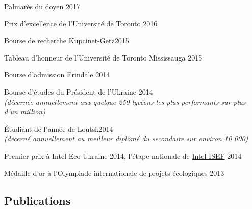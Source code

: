 \documentclass[margin,line]{res}
\begin{document}
\begin{resume}
\vspace*{-3mm}

Palmarès du doyen \hfill{2017}

\vspace*{-3mm}

Prix d'excellence de l'Université de Toronto \href{https://registrar.utoronto.ca/finances-and-funding/utea/}{}\hfill{2016}


\vspace*{-3mm}

Bourse de recherche \href{https://www.weizmann.ac.il/feinberg/admissions/kupcinet-getz-international-summer-school/about-program-0}{Kupcinet-Getz}\hfill{2015}

\vspace*{-3mm}


Tableau d'honneur de l'Université de Toronto Mississauga \href{https://www.utm.utoronto.ca/cps/honour-roll/2014-15}{} \hfill{2015}

\vspace*{-3mm}

Bourse d'admission Erindale  \hfill{2014} 

\vspace*{-3mm}

Bourse d'études du Président de l'Ukraine \hfill{2014}\\
{\em(décernée annuellement aux quelque 250 lycéens les plus performants sur plus d'un million)}

\vspace*{-3mm}

Étudiant de l'année de Loutsk\hfill{2014}\\
{\em(décerné annuellement au meilleur diplômé du secondaire sur environ 10 000)}
\vspace*{-3mm}

Premier prix à Intel-Eco Ukraine 2014, l'étape nationale de \href{https://student.societyforscience.org/intel-isef}{Intel ISEF} \hfill{2014}

\vspace*{-3mm}

Médaille d'or à l'Olympiade internationale de projets écologiques \hfill{2013}


\end{resume}
\newpage
\pagestyle{headings}
\begin{resume}
\section{\sc Publications}


\end{resume}
\end{document}
